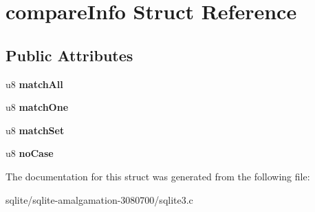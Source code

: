 \hypertarget{structcompare_info}{\section{compare\+Info Struct Reference}
\label{structcompare_info}
}
\subsection*{Public Attributes}
\begin{DoxyCompactItemize}
\item 
\hypertarget{structcompare_info_a1161e850029ef556e6daee856d32b2e2}{u8 {\bfseries match\+All}}\label{structcompare_info_a1161e850029ef556e6daee856d32b2e2}

\item 
\hypertarget{structcompare_info_ab9aabbf6d3df26bad786b532330a2fd7}{u8 {\bfseries match\+One}}\label{structcompare_info_ab9aabbf6d3df26bad786b532330a2fd7}

\item 
\hypertarget{structcompare_info_a5d2ff58a72c9eb7d22f18915c1751655}{u8 {\bfseries match\+Set}}\label{structcompare_info_a5d2ff58a72c9eb7d22f18915c1751655}

\item 
\hypertarget{structcompare_info_a6de76861b066547321f7a255cb7042ab}{u8 {\bfseries no\+Case}}\label{structcompare_info_a6de76861b066547321f7a255cb7042ab}

\end{DoxyCompactItemize}


The documentation for this struct was generated from the following file\+:\begin{DoxyCompactItemize}
\item 
sqlite/sqlite-\/amalgamation-\/3080700/sqlite3.\+c\end{DoxyCompactItemize}
